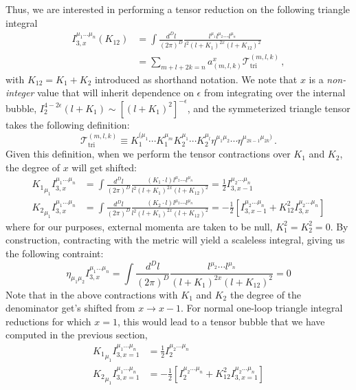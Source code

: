 \documentclass[12pt,letter]{article}
\begin{document}
Thus, we are interested in performing a tensor reduction on the following triangle integral
\begin{align}\label{triangleTensorInt}
     I^{\mu_1\dots \mu_n}_{3,x}(K_{12})&= \int \frac{d^D l}{(2\pi)^D} \frac{l^{\mu_1}l^{\mu_2}\cdots l^{\mu_n} }{l^2(l+K_{1})^{2x}(l+K_{12})^2}
     \\
     &= \sum_{m+l+2k=n}a^{x}_{(m,l,k)} \mathcal{T}^{(m,l,k)}_{\text{tri}}\,,
\end{align}
with $K_{12}=K_1+K_2$ introduced as shorthand notation. We note that $x$ is a \textit{non-integer} value that will inherit dependence on $\epsilon$ from integrating over the internal bubble, $I^{4-2\epsilon}_2(l+K_1)\sim [(l+K_1)^2]^{-\epsilon}$, and the symmeterized triangle tensor takes the following definition:
\begin{equation}
\mathcal{T}^{(m,l,k)}_{\text{tri}} \equiv   K_1^{(\mu_1}\cdots K_1^{\mu_m}K_2^{\mu_1}\cdots K_2^{\mu_l}\eta^{\mu_1\mu_2}\cdots \eta^{\mu_{2k-1}\mu_{2k})}\,.
\end{equation}
Given this definition, when we perform the tensor contractions over $K_1$ and $K_2$, the degree of $x$ will get shifted:
\begin{align}
{K_1}_{\mu_1}I^{\mu_1\dots \mu_n}_{3,x}&= \int \frac{d^D l}{(2\pi)^D} \frac{(K_1\cdot l)l^{\mu_2}\cdots l^{\mu_n} }{l^2(l+K_{1})^{2x}(l+K_{12})^2} = \frac{1}{2}I^{\mu_2\dots \mu_n}_{3,x-1}
\\
{K_2}_{\mu_1}I^{\mu_1\dots \mu_n}_{3,x}&= \int \frac{d^D l}{(2\pi)^D} \frac{(K_2\cdot l)l^{\mu_2}\cdots l^{\mu_n} }{l^2(l+K_{1})^{2x}(l+K_{12})^2} = -\frac{1}{2}\left[I^{\mu_2\dots \mu_n}_{3,x-1}+K_{12}^2 I^{\mu_2\dots \mu_n}_{3,x}\right]
\end{align}
where for our purposes, external momenta are taken to be null, $K_1^2=K_2^2 = 0$. By construction, contracting with the metric will yield a scaleless integral, giving us the following contraint:
\begin{equation}
\eta_{\mu_1\mu_2}I^{\mu_1\dots \mu_n}_{3,x}= \int \frac{d^D l}{(2\pi)^D}\frac{l^{\mu_2}\cdots l^{\mu_n} }{(l+K_{1})^{2x}(l+K_{12})^2} = 0
\end{equation}
Note that in the above contractions with $K_1$ and $K_2$ the degree of the denominator get's shifted from $x\rightarrow x-1$. For normal one-loop triangle integral reductions for which $x=1$, this would lead to a tensor bubble that we have computed in the previous section,
\begin{align}
{K_1}_{\mu_1}I^{\mu_1\dots \mu_n}_{3,x=1}& = \frac{1}{2}I^{\mu_2\dots \mu_n}_{2}
\\
{K_2}_{\mu_1}I^{\mu_1\dots \mu_n}_{3,x=1}& = -\frac{1}{2}\left[I^{\mu_2\dots \mu_n}_{2}+K_{12}^2 I^{\mu_2\dots \mu_n}_{3,x=1}\right]
\end{align}
\end{document}
